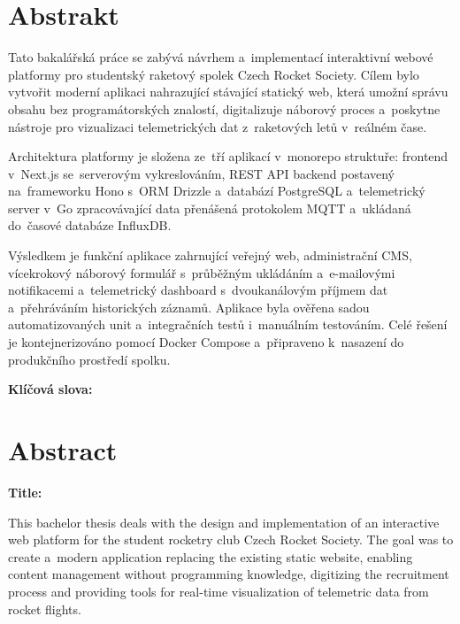 \documentclass[12pt,a4paper]{report}
\begin{document}






\chapter*{Abstrakt}
\begin{sloppypar}
Tato bakalářská práce se zabývá návrhem a~implementací interaktivní webové platformy pro studentský raketový spolek Czech Rocket Society. Cílem bylo vytvořit moderní aplikaci nahrazující stávající statický web, která umožní správu obsahu bez programátorských znalostí, digitalizuje náborový proces a~poskytne nástroje pro vizualizaci telemetrických dat z~raketových letů v~reálném čase.
\end{sloppypar}

Architektura platformy je složena ze~tří aplikací v~monorepo struktuře: frontend v~Next.js se~serverovým vykreslováním, REST API backend postavený na~frameworku Hono s~ORM Drizzle a~databází PostgreSQL a~telemetrický server v~Go zpracovávající data přenášená protokolem MQTT a~ukládaná do~časové databáze InfluxDB.

Výsledkem je funkční aplikace zahrnující veřejný web, administrační CMS, vícekrokový náborový formulář s~průběžným ukládáním a~e-mailovými notifikacemi a~telemetrický dashboard s~dvoukanálovým příjmem dat a~přehráváním historických záznamů. Aplikace byla ověřena sadou automatizovaných unit a~integračních testů i~manuálním testováním. Celé řešení je kontejnerizováno pomocí Docker Compose a~připraveno k~nasazení do produkčního prostředí spolku.

\vspace{1em}
\noindent\textbf{Klíčová slova:} \keywords

\chapter*{Abstract}

\noindent\textbf{Title: \thesistitleEN}

\vspace{1em}

\noindent This bachelor thesis deals with the design and implementation of an interactive web platform for the student rocketry club Czech Rocket Society. The goal was to create a~modern application replacing the existing static website, enabling content management without programming knowledge, digitizing the recruitment process and providing tools for real-time visualization of telemetric data from rocket flights.
\end{document}
